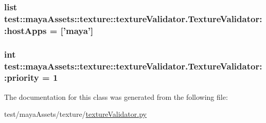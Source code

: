 \hypertarget{classtest_1_1mayaAssets_1_1texture_1_1textureValidator_1_1TextureValidator_a798940c9fe7c236da2459ea5934a2712}{
\subsubsection[{host\-Apps}]{\setlength{\rightskip}{0pt plus 5cm}list {\bf test\-::maya\-Assets\-::texture\-::texture\-Validator.\-Texture\-Validator\-::host\-Apps} = \mbox{[}'maya'\mbox{]}}}\label{d2/d2a/classtest_1_1mayaAssets_1_1texture_1_1textureValidator_1_1TextureValidator_a798940c9fe7c236da2459ea5934a2712}
\hypertarget{classtest_1_1mayaAssets_1_1texture_1_1textureValidator_1_1TextureValidator_a22be4c65ac93e5f482d2adbf1b09760d}{
\subsubsection[{priority}]{\setlength{\rightskip}{0pt plus 5cm}int {\bf test\-::maya\-Assets\-::texture\-::texture\-Validator.\-Texture\-Validator\-::priority} = 1}}\label{d2/d2a/classtest_1_1mayaAssets_1_1texture_1_1textureValidator_1_1TextureValidator_a22be4c65ac93e5f482d2adbf1b09760d}


\-The documentation for this class was generated from the following file\-:\begin{DoxyCompactItemize}
\item 
test/maya\-Assets/texture/\hyperlink{textureValidator_8py}{texture\-Validator.\-py}\end{DoxyCompactItemize}
